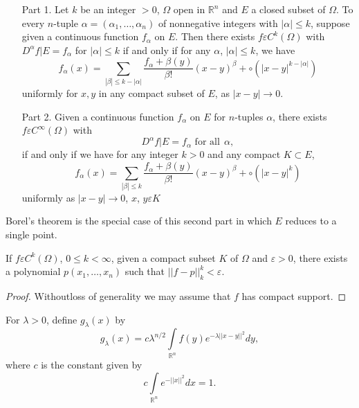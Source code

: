 \begin{enumerate}
\item[Part 1.] Let  $k$ be an integer $> 0$, $\Omega$ open in
  $\mathbb{R}^n$  and $E$ a closed subset of $\Omega$. To every
  $n$-tuple $\alpha = (\alpha _1, \ldots, \alpha _n)$ of nonnegative
  integers with $| \alpha | \leq k$, suppose given a continuous
  function $f_\alpha$ on $E$. Then there exists $f \varepsilon C^k (\Omega)$
  with $D^\alpha f | E = f_\alpha$ for $| \alpha | \leq k$ if and only
  if for any $\alpha$, $| \alpha | \leq k$, we have  
  $$
  f_\alpha (x) = \sum_{ |\beta|\leq k - | \alpha | } \frac{f _\alpha +
    \beta (y)}{ \beta !} (x - y)^\beta + \circ (| x - y | ^{ k -
    |\alpha|}) 
  $$
  uniformly for $x, y$ in any compact subset of $E$, as $| x - y | \to 0$. 

\item[Part 2.]  Given  a continuous function $f_\alpha$ on $E$ for
   $n$-tuples $\alpha$, there exists $f \varepsilon C^\infty
  (\Omega)$ with  
  $$
  D^\alpha f \bigg| E = f_\alpha \text{ for  all} ~~\alpha, 
  $$
  if and only if we have for any integer $k > 0$ and any compact $K
  \subset E$,  
  $$
  f_\alpha (x) = \sum_{ |\beta |\leq k} \frac{f_\alpha +\beta
    (y)}{\beta!} (x - y)^\beta + \circ (| x - y | ^k)  
  $$
  uniformly as $|x - y| \to 0$, $x$, $y \varepsilon K$
\end{enumerate}

Borel's  theorem is the special case of this second part in which $E$
reduces to a single point.  

\begin{theorem}[Weierstrass]\label{chap1:sec5:thm2}%
  If $f \varepsilon C^k(\Omega)$, $0 \leq k < \infty$, given a compact subset
  $K$ of $\Omega$ and $\varepsilon > 0$, there exists a polynomial $p(x_1,
  \ldots, x_n)$ such that $|| f - p ||^k _k < \varepsilon $. 
\end{theorem}

\begin{proof}%
  Without\pageoriginale loss of generality we may assume that $f$ has compact support. 
\end{proof}

For $\lambda > 0$, define $g_\lambda (x)$ by 
\begin{equation*}
  g_\lambda (x) = c \lambda ^{n /2} \int\limits_{\mathbb{R}^n} f (y) e
  ^{ - \lambda || x - y || ^2} dy, \tag{5.1}\label{chap1:sec5:eq5.1} 
\end{equation*}
where $c$ is the constant given by 
$$
c \int\limits_{\mathbb{R}^n} e^{- || x ||^2} dx = 1. 
$$

